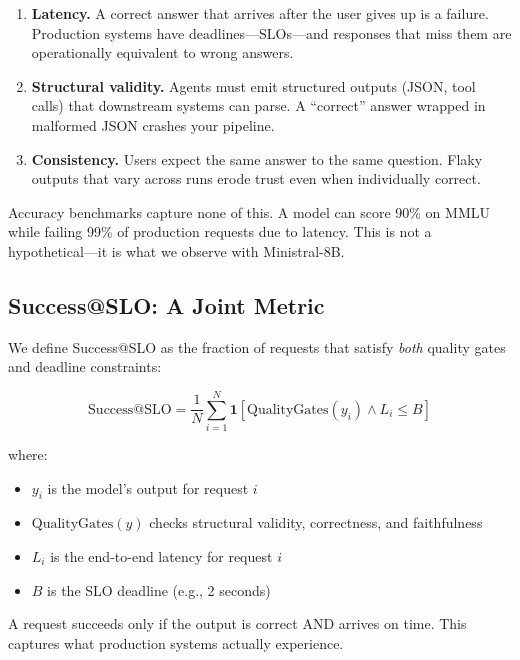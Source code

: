 \documentclass[11pt]{article}
\begin{document}
\begin{enumerate}[leftmargin=12pt]
    \item \textbf{Latency.} A correct answer that arrives after the user gives up is a failure. Production systems have deadlines---SLOs---and responses that miss them are operationally equivalent to wrong answers.

    \item \textbf{Structural validity.} Agents must emit structured outputs (JSON, tool calls) that downstream systems can parse. A ``correct'' answer wrapped in malformed JSON crashes your pipeline.

    \item \textbf{Consistency.} Users expect the same answer to the same question. Flaky outputs that vary across runs erode trust even when individually correct.
\end{enumerate}

Accuracy benchmarks capture none of this.
A model can score 90\% on MMLU while failing 99\% of production requests due to latency.
This is not a hypothetical---it is what we observe with Ministral-8B.

\subsection{Success@SLO: A Joint Metric}

We define Success@SLO as the fraction of requests that satisfy \emph{both} quality gates and deadline constraints:

\begin{equation}
\text{Success@SLO} = \frac{1}{N} \sum_{i=1}^{N} \mathbf{1}\left[\text{QualityGates}(y_i) \wedge L_i \leq B\right]
\end{equation}

where:
\begin{itemize}[leftmargin=12pt]
    \item $y_i$ is the model's output for request $i$
    \item $\text{QualityGates}(y)$ checks structural validity, correctness, and faithfulness
    \item $L_i$ is the end-to-end latency for request $i$
    \item $B$ is the SLO deadline (e.g., 2 seconds)
\end{itemize}

A request succeeds only if the output is correct AND arrives on time.
This captures what production systems actually experience.
\end{document}
